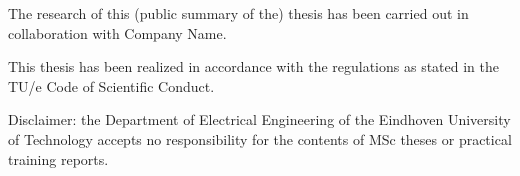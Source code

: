 \documentclass[12pt,a4paper]{article}
\begin{document}
\vspace{1cm}

{\small The research of this (public summary of the) thesis has been carried out in collaboration with Company Name.}

\vspace{0.4cm}
{\small This thesis has been realized in accordance with the regulations as stated in the TU/e Code of Scientific Conduct.}

\vspace{0.4cm}

{\small Disclaimer: the Department of Electrical Engineering of the Eindhoven University of Technology accepts no responsibility for the contents of MSc theses or practical training reports.}

\vfill
\end{document}
